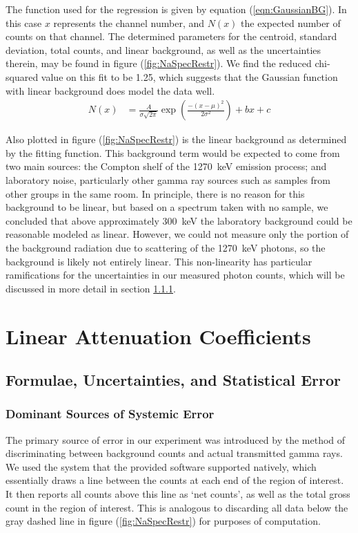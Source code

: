\documentclass[letter]{article}
\begin{document}
The function used for the regression is given by equation (\ref{eqn:GaussianBG}). In this case $x$ represents the channel number, and $N(x)$ the expected number of counts on that channel. The determined parameters for the centroid, standard deviation, total counts, and linear background, as well as the uncertainties therein, may be found in figure (\ref{fig:NaSpecRestr}). We find the reduced chi-squared value on this fit to be 1.25, which suggests that the Gaussian function with linear background does model the data well.
\begin{align}
N(x)
&=
\frac{A}{\sigma \sqrt{2 \pi}} \exp \left( \frac{- (x-\mu)^2}{2 \sigma^2} \right) + bx + c
\end{align}

Also plotted in figure (\ref{fig:NaSpecRestr}) is the linear background as determined by the fitting function. This background term would be expected to come from two main sources: the Compton shelf of the \qty{1270}{\kilo\electronvolt} emission process; and laboratory noise, particularly other gamma ray sources such as samples from other groups in the same room. In principle, there is no reason for this background to be linear, but based on a spectrum taken with no sample, we concluded that above approximately \qty{300}{\kilo\electronvolt} the laboratory background could be reasonable modeled as linear. However, we could not measure only the portion of the background radiation due to scattering of the \qty{1270}{\kilo\electronvolt} photons, so the background is likely not entirely linear. This non-linearity has particular ramifications for the uncertainties in our measured photon counts, which will be discussed in more detail in section \ref{sss:SysError}.


\section{Linear Attenuation Coefficients}

\subsection{Formulae, Uncertainties, and Statistical Error}

\subsubsection{Dominant Sources of Systemic Error} \label{sss:SysError}

The primary source of error in our experiment was introduced by the method of discriminating between background counts and actual transmitted gamma rays. We used the system that the provided software supported natively, which essentially draws a line between the counts at each end of the region of interest. It then reports all counts above this line as `net counts', as well as the total gross count in the region of interest. This is analogous to discarding all data below the gray dashed line in figure (\ref{fig:NaSpecRestr}) for purposes of computation.
\end{document}
